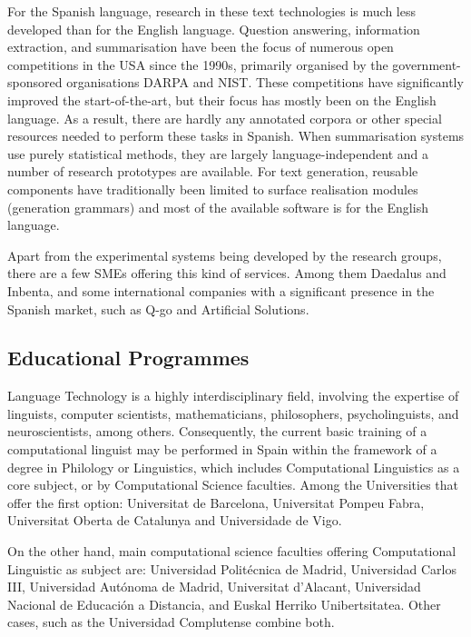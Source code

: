 \begin{multicols}{2}
For the Spanish language, research in these text technologies is much less developed than for the English language. Question answering, information extraction, and summarisation have been the focus of numerous open competitions in the USA since the 1990s, primarily organised by the government-sponsored organisations DARPA and NIST. These competitions have significantly improved the start-of-the-art, but their focus has mostly been on the English language. As a result, there are hardly any annotated corpora or other special resources needed to perform these tasks in Spanish. When summarisation systems use purely statistical methods, they are largely language-independent and a number of research prototypes are available. For text generation, reusable components have traditionally been limited to surface realisation modules (generation grammars) and most of the available software is for the English language.

Apart from the experimental systems being developed by the research groups, there are a few SMEs offering this kind of services. Among them Daedalus and Inbenta, and some international companies with a significant presence in the Spanish market, such as Q-go  and Artificial Solutions.

\subsection{Educational Programmes}

Language Technology is a highly interdisciplinary field, involving the expertise of linguists, computer scientists, mathematicians, philosophers, psycholinguists, and neuroscientists, among others. Consequently, the current basic training of a computational linguist may be performed in Spain within the framework of a degree in Philology or Linguistics, which includes Computational Linguistics as a core subject, or by Computational Science faculties. Among the Universities that offer the first option: Universitat de Barcelona, Universitat Pompeu Fabra, Universitat Oberta de Catalunya and Universidade de Vigo. 


On the other hand, main computational science faculties offering Computational Linguistic as subject are: Universidad Politécnica de Madrid, Universidad Carlos III, Universidad Autónoma de Madrid, Universitat d’Alacant, Universidad Nacional de Educación a Distancia, and Euskal Herriko Unibertsitatea. Other cases, such as the Universidad Complutense combine both.


\end{multicols}
